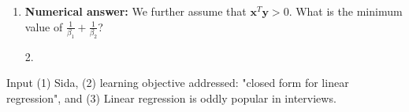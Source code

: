 \begin{questions}
\begin{enumerate} [label=(\roman*)]
\item \textbf{Numerical answer:} We further assume that $\mathbf{x}^T\mathbf{y} > 0$. What is the minimum value of $\frac{1}{\beta_1} + \frac{1}{\beta_2}$?
    \begin{tcolorbox}[fit,height=1cm, width=2cm, blank, borderline={1pt}{-2pt}]
    \end{tcolorbox}
    \begin{soln}
    2.
    \end{soln}

\end{enumerate}
    \begin{qauthor}
    Input (1) Sida, (2) learning objective addressed: "closed form for linear regression", and (3) Linear regression is oddly popular in interviews.
    \end{qauthor}


\end{questions}

